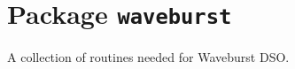 \chapter{Package \texttt{waveburst}}

A collection of routines needed for Waveburst DSO. 

\newpage
